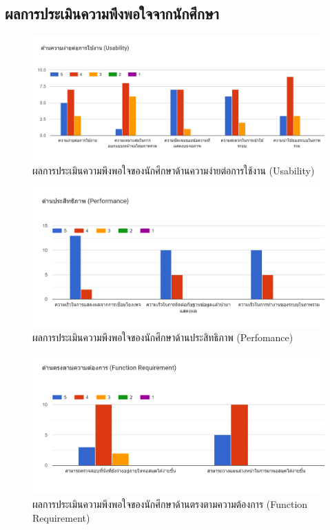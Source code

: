 \subsection{ผลการประเมินความพึงพอใจจากนักศึกษา}
\begin{figure}[ht]
    \centering
    \includegraphics[scale=0.6]{images/student-u.png}
    \caption[st-u]{ผลการประเมินความพึงพอใจของนักศึกษาด้านความง่ายต่อการใช้งาน (Usability)}
    \label{fig:st-u}
\end{figure}
\begin{figure}[ht]
    \centering
    \includegraphics[scale=0.6]{images/student-p.png}
    \caption[st-p]{ผลการประเมินความพึงพอใจของนักศึกษาด้านประสิทธิภาพ (Perfomance)}
    \label{fig:st-p}
\end{figure}
\begin{figure}[ht]
    \centering
    \includegraphics[scale=0.6]{images/student-f.png}
    \caption[st-f]{ผลการประเมินความพึงพอใจของนักศึกษาด้านตรงตามความต้องการ (Function Requirement)}
    \label{fig:st-f}
\end{figure}

